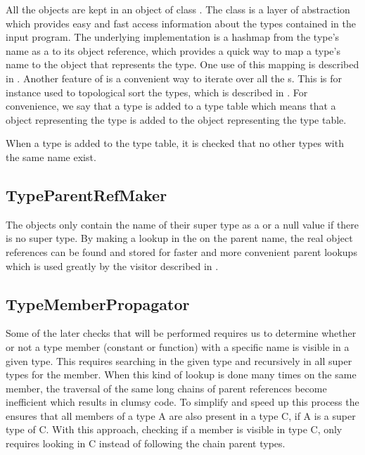 All the  objects are kept in an object of class
. The  class is a layer of abstraction
which provides easy and fast access information about the types contained in the
input program. The underlying implementation is a hashmap from the type's name
as a  to its object reference, which provides a quick way to map a type's name
to the  object that represents the type. One use of this mapping is 
described in . Another feature of  is a 
convenient way to iterate over all the s. This is for instance used
to topological sort the types, which is described in .
For convenience, we say that a type is added to a type table which means that a
 object representing the type is added to the
 object representing the type table.

When a type is added to the type table, it is checked that no other types with
the same name exist.

\subsection{TypeParentRefMaker}
\label{sec:TypeParentRefMaker}
The  objects only contain the name of their super type
as a  or a null value if there is no super type. By making a
lookup in the  on the parent name, the real object
references can be found and stored for faster and more convenient parent lookups
which is used greatly by the visitor described in 
.

\subsection{TypeMemberPropagator}
\label{sec:TypeMemberPropagator}
Some of the later checks that will be performed requires us to determine whether
or not a type member (constant or function) with a specific name is visible in a
given type. This requires searching in the given type and recursively in all
super types for the member. When this kind of lookup is done many times on the
same member, the traversal of the same long chains of parent references become
inefficient which results in clumsy code. To simplify and speed up this process
the  ensures that all members of a type A are
also present in a type C, if A is a super type of C. With this approach,
checking if a member is visible in type C, only requires looking in C instead of
following the chain parent types.

